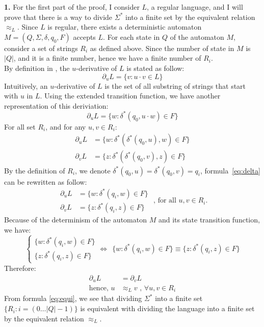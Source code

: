 \documentclass[a4paper,12pt]{article}
\begin{document}
\textbf{1.} For the first part of the proof, I consider $L$, a regular language, and I will prove that there is a way to divide $\Sigma^{*}$ into a finite set by the equivalent relation $\approx_{L}$. Since $L$ is regular, there exists a deterministic automaton $M=(Q,\Sigma,\delta,q_{0},F)$ accepts $L$. For each state in $Q$ of the automaton $M$, consider a set of strings $R_{i}$ as defined above. Since the number of state in $M$ is $|Q|$, and it is a finite number, hence we have a finite number of $R_{i}$.\\[1em]
By definition in \cite{lec2}, the $u$-derivative of $L$ is stated as follow:
$$\partial_{u}L = \{v : u\cdot v \in L\}$$
\noindent
Intuitively, an $u$-derivative of $L$ is the set of all substring of strings that start with $u$ in $L$. Using the extended transition function, we have another representation of this deriviation:
$$\partial_{u}L = \{w : \delta^{*}(q_{0},u\cdot w) \in F\}$$
\noindent
For all set $R_{i}$, and for any $u, v \in R_{i}$:
\begin{equation} \label{eq:delta}
    \begin{aligned}
        \partial_{u}L & = \{w : \delta^{*}(\delta^{*}(q_{0},u), w) \in F\} \\
        \partial_{v}L & = \{z : \delta^{*}(\delta^{*}(q_{0},v), z) \in F\}
    \end{aligned}
\end{equation}
\noindent
By the definition of $R_{i}$, we denote $\delta^{*}(q_{0},u) = \delta^{*}(q_{0},v) = q_{i}$, formula~\eqref{eq:delta} can be rewritten as follow:
\begin{equation*}
    \begin{aligned}
        \partial_{u}L & = \{w : \delta^{*}(q_{i}, w) \in F\} \\
        \partial_{v}L & = \{z : \delta^{*}(q_{i}, z) \in F\}
    \end{aligned}
    \mbox{   , for all } u, v \in R_{i}.
\end{equation*}
\noindent
Because of the determinism of the automaton $M$ and its state transition function, we have:
\begin{equation*}
        \begin{cases}
            \{w : \delta^{*}(q_{i}, w) \in F\} \\
            \{z : \delta^{*}(q_{i}, z) \in F\}
        \end{cases} 
        \Leftrightarrow\ \  \{w : \delta^{*}(q_{i}, w) \in F\} \equiv \{z : \delta^{*}(q_{i}, z) \in F\}
\end{equation*}
Therefore:
\begin{equation} \label{eq:equi}
    \begin{aligned}
        \partial_{u}L & = \partial_{v}L \\
        \mbox{hence,\ \ \ \ \ } u & \approx_{L} v\mbox{\ \ , } \forall u, v \in R_{i}
    \end{aligned}
\end{equation}
\noindent
From formula \eqref{eq:equi}, we see that dividing $\Sigma^{*}$ into a finite set $\{R_{i} : i = (0\ldots|Q|-1)\}$ is equivalent with dividing the language into a finite set by the equivalent relation $\approx_{L}$.
\end{document}
